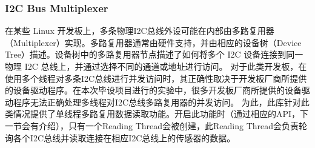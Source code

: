 \subsubsection{I2C Bus Multiplexer}
在某些 Linux 开发板上，多条物理I2C总线外设可能在内部由多路复用器（Multiplexer）实现。多路复用器通常由硬件支持，并由相应的设备树（Device Tree）描述。设备树中的多路复用器节点描述了如何将多个 I2C 设备连接到同一物理 I2C 总线上，并通过选择不同的通道或地址进行访问。
对于此类开发板，在使用多个线程对多条I2C总线进行并发访问时，其正确性取决于开发板厂商所提供的设备驱动程序。在本次毕设项目进行的实验中，很多开发板厂商所提供的设备驱动程序无法正确处理多线程对I2C总线多路复用器的并发访问。
为此，此库针对此类情况提供了单线程多路复用数据读取功能。开启此功能时（通过相应的API，下一节会有介绍），只有一个Reading Thread会被创建，此Reading Thread会负责轮询各个I2C总线并读取连接在相应I2C总线上的传感器的数据。

